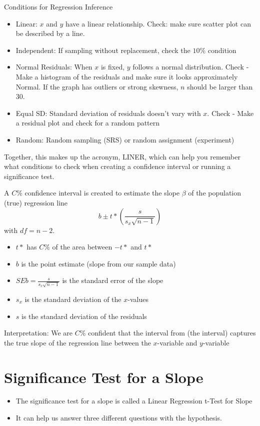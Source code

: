 \documentclass[../stats.tex]{subfiles}
\begin{document}
Conditions for Regression Inference 
\begin{itemize}
    \item Linear: $x$ and $y$ have a linear relationship. Check: make sure scatter plot can be described by a line.
    \item Independent: If sampling without replacement, check the $10\%$ condition 
    \item Normal Residuals: When $x$ is fixed, $y$ follows a normal distribution. Check - Make a histogram of the residuals and make sure it looks approximately Normal. If the graph has outliers or strong skewness, $n$ should be larger than 30.
    \item Equal SD: Standard deviation of residuals doesn't vary with $x$. Check - Make a residual plot and check for a random pattern 
    \item Random: Random sampling (SRS) or random assignment (experiment)
\end{itemize}

Together, this makes up the acronym, LINER, which can help you remember what conditions to check when creating a confidence interval or running a significance test.

A $C\%$ confidence interval is created to estimate the slope $\beta$ of the population (true) regression line 
\[ b\pm t*\left(\frac{s}{s_x\sqrt{n-1}}\right) \]
with $df=n-2$.

\begin{itemize}
    \item $t*$ has $C\%$ of the area between $-t*$ and $t*$
    \item $b$ is the point estimate (slope from our sample data)
    \item $SEb=\frac{s}{s_x\sqrt{n-1}}$ is the standard error of the slope 
    \item $s_x$ is the standard deviation of the $x$-values 
    \item $s$ is the standard deviation of the residuals 
\end{itemize}

Interpretation: We are $C\%$ confident that the interval from (the interval) captures the true slope of the regression line between the $x$-variable and $y$-variable 

\section{Significance Test for a Slope}
\begin{itemize}
    \item The significance test for a slope is called a Linear Regression t-Test for Slope 
    \item It can help us answer three different questions with the hypothesis.
\end{itemize}
\end{document}
